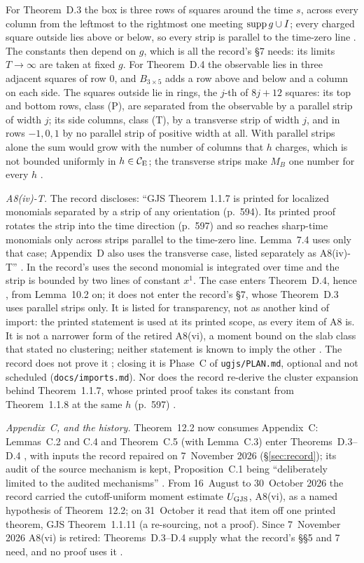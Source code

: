 For Theorem~D.3 the box is three rows of squares around the time $s$, across every column
from the leftmost to the rightmost one meeting $\operatorname{supp} g\cup I$; every charged square outside lies
above or below, so every strip is parallel to the time-zero line .
The constants then depend on $g$, which is all the record's \S7 needs: its limits
$T\to\infty$ are taken at fixed $g$. For Theorem~D.4 the observable lies in three
adjacent squares of row $0$, and $B_{3\times5}$ adds a row above and below and a column on
each side. The squares outside lie in rings, the $j$-th of $8j+12$ squares: its top and
bottom rows, class (P), are separated from the observable by a parallel strip of width
$j$; its side columns, class (T), by a transverse strip of width $j$, and in rows
$-1,0,1$ by no parallel strip of positive width at all. With parallel strips alone the
sum would grow with the number of columns that $h$ charges, which is not bounded uniformly
in $h\in\mathcal{C}_{\mathrm E}$; the transverse strips make $M_B$ one number for every $h$
.

\emph{A8(iv)-T.} The record discloses: ``GJS Theorem 1.1.7 is printed for localized
monomials separated by a strip of any orientation (p.~594). Its printed proof rotates the
strip into the time direction (p.~597) and so reaches sharp-time monomials only across
strips parallel to the time-zero line. Lemma~7.4 uses only that case; Appendix~D also uses
the transverse case, listed separately as A8(iv)-T'' . In the record's
uses the second monomial is integrated over time and the strip is bounded by two lines of
constant $x^1$. The case enters Theorem~D.4, hence , from Lemma~10.2 on; it does not enter the record's \S7, whose
Theorem~D.3 uses parallel strips only. It is listed for transparency, not as another kind
of import: the printed statement is used at its printed scope, as every item of A8 is. It is not a narrower form of the retired A8(vi), a moment bound on the slab
class that stated no clustering; neither statement is known to imply the other
. The record does not prove it ; closing it is
Phase~C of \texttt{ugjs/PLAN.md}, optional and not scheduled (\texttt{docs/imports.md}).
Nor does the record re-derive the cluster expansion behind Theorem~1.1.7, whose printed
proof takes its constant from Theorem~1.1.8 at the same $h$ (p.~597)
.

\emph{Appendix~C, and the history.} Theorem~12.2 now consumes Appendix~C: Lemmas~C.2 and
C.4 and Theorem~C.5 (with Lemma~C.3) enter Theorems~D.3--D.4 , with
inputs the record repaired on 7~November 2026 (\S\ref{sec:record}); its audit of the source
mechanism is kept, Proposition~C.1 being ``deliberately limited to the audited
mechanisms'' . From 16~August to 30~October 2026 the record
carried the cutoff-uniform moment estimate $U_{\mathrm{GJS}}$, A8(vi), as a named hypothesis of
Theorem~12.2; on 31~October it read that item off one printed theorem, GJS
Theorem~1.1.11 (a re-sourcing, not a proof). Since 7~November 2026 A8(vi) is retired:
Theorems~D.3--D.4 supply what the record's \S\S5 and 7 need, and no proof uses it
.

